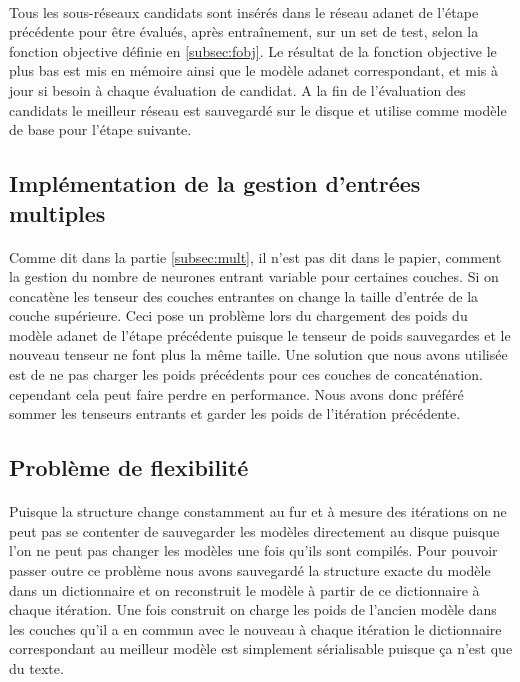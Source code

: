 \documentclass[11 pt]{article}
\begin{document}
\paragraph{}Tous les sous-réseaux candidats sont insérés dans le réseau adanet de l’étape précédente pour être évalués, après entraînement, sur un set de test, selon la fonction objective définie en \ref{subsec:fobj}. Le résultat de la fonction objective le plus bas est mis en mémoire ainsi que le modèle adanet correspondant, et mis à jour si besoin à chaque évaluation de candidat. A la fin de l’évaluation des candidats le meilleur réseau est sauvegard\'e sur le disque et utilise comme modèle de base pour l’étape suivante.

\subsection{Implémentation de la gestion d’entrées multiples}
\paragraph{}Comme dit dans la partie \ref{subsec:mult}, il n'est pas dit dans le papier, comment la gestion du nombre de neurones entrant variable pour certaines couches. Si on concatène les tenseur des couches entrantes on change la taille d’entrée de la couche supérieure. Ceci pose un problème lors du chargement des poids du modèle adanet de l’étape précédente
puisque le tenseur de poids sauvegardes et le nouveau tenseur ne font plus la même taille. Une solution que nous avons utilisée est de ne pas charger les poids précédents pour ces couches de concaténation. cependant cela peut faire perdre en performance. Nous avons donc préféré sommer les tenseurs entrants et garder les poids de l’itération précédente.

\subsection{Problème de flexibilité}
\paragraph{} Puisque la structure change constamment au fur et à mesure des itérations on ne peut pas se contenter de sauvegarder les modèles directement au disque puisque l'on ne peut pas changer les modèles une fois qu'ils sont compil\'es. Pour pouvoir passer outre ce problème nous avons sauvegard\'e la structure exacte du modèle dans un dictionnaire et on reconstruit le modèle \`a partir de ce dictionnaire à chaque itération. Une fois construit on charge les poids de l'ancien modèle dans les couches qu'il a en commun avec le nouveau à chaque itération le dictionnaire correspondant au meilleur modèle est simplement s\'erialisable puisque ça n'est que du texte.
\end{document}
